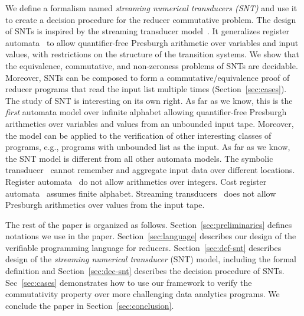 We define a formalism named \emph{streaming numerical transducers (SNT)} and use it to create a decision procedure for the reducer commutative problem.
The design of SNTs is inspired by the streaming transducer model~\cite{RP11}.
It generalizes register automata~\cite{KF94,NSV04} to allow quantifier-free Presburgh arithmetic over variables and input values, with restrictions on the structure of the transition systems.
We show that the equivalence, commutative, and non-zeroness problems of SNTs are decidable.
Moreover, SNTs can be composed to form a commutative/equivalence proof of reducer programs that read the input list multiple times (Section~\ref{sec:cases}).
The study of SNT is interesting on its own right. As far as we know, this is the \emph{first} automata model over infinite alphabet allowing quantifier-free Presburgh arithmetics over variables and values from an unbounded input tape. Moreover, the model can be applied to the verification of other interesting classes of programs, e.g., programs with unbounded list as the input.
As far as we know, the SNT model  is different from all other automata models. The symbolic transducer~\cite{VHL+12} cannot remember and aggregate input data over different locations. Register automata~\cite{KF94,NSV04} do not allow arithmetics over integers. Cost register automata~\cite{ADD+13} assumes finite alphabet. Streaming transducers~\cite{RP11} does not allow Presburgh arithmetics over values from the input tape.  

The rest of the paper is organized as follows. Section~\ref{sec:preliminaries} defines notations we use in the paper. Section~\ref{sec:language} describes our design of the verifiable programming language for reducers. Section~\ref{sec:def-snt} describes design of the \emph{streaming numerical transducer} (SNT) model, including the formal definition and Section~\ref{sec:dec-snt} describes the decision procedure of SNTs. Sec~\ref{sec:cases} demonstrates how to use our framework to verify the commutativity property over more challenging data analytics programs. We conclude the paper in Section~\ref{sec:conclusion}. 